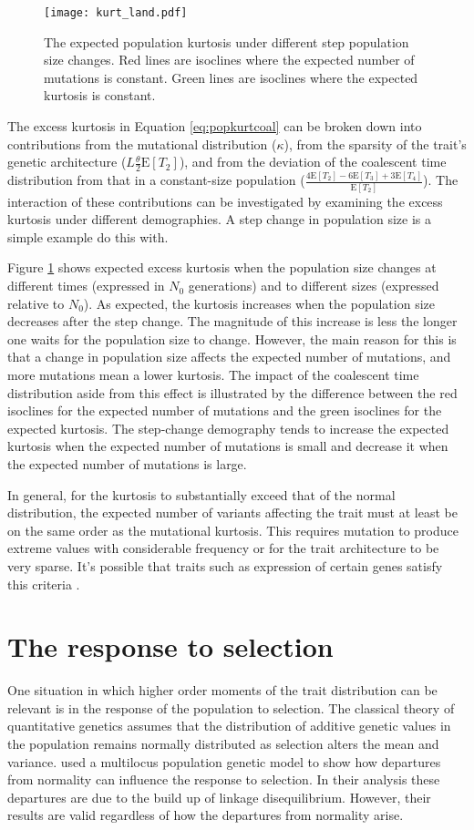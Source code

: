 \documentclass{article}
\newcommand{\T}{\frac{\theta}{2}}
\newcommand{\E}{\mathrm{E}}
\begin{document}
\begin{figure}
  \centering
  \texttt{[image: kurt\_land.pdf]}
  \caption{\footnotesize The expected population kurtosis under different step
    population size changes. Red lines are isoclines where the expected number
    of mutations is constant. Green lines are isoclines where the expected
    kurtosis is constant.}
  \label{fig:kurtscape}
\end{figure}

The excess kurtosis in Equation \ref{eq:popkurtcoal} can be broken down into
contributions from the mutational distribution ($\kappa$), from the sparsity of
the trait's genetic architecture ($L \T \E[T_2]$), and from the deviation of
the coalescent time distribution from that in a constant-size population
($\frac{ 4\E[T_2] - 6\E[T_3] + 3\E[T_4] }{ \E[T_2] }$). The interaction of these
contributions can be investigated by examining the excess kurtosis under
different demographies. A step change in population size is a simple example do
this with.

Figure \ref{fig:kurtscape} shows expected excess kurtosis when the population
size changes at different times (expressed in $N_0$ generations) and to
different sizes (expressed relative to $N_0$). As expected, the kurtosis
increases when the population size decreases after the step change. The
magnitude of this increase is less the longer one waits for the population size
to change. However, the main reason for this is that a change in population size
affects the expected number of mutations, and more mutations mean a lower
kurtosis. The impact of the coalescent time distribution aside from this effect
is illustrated by the difference between the red isoclines for the expected
number of mutations and the green isoclines for the expected kurtosis. The
step-change demography tends to increase the expected kurtosis when the expected
number of mutations is small and decrease it when the expected number of
mutations is large.

In general, for the kurtosis to substantially exceed that of the normal
distribution, the expected number of variants affecting the trait must at least
be on the same order as the mutational kurtosis. This requires mutation to
produce extreme values with considerable frequency or for the trait architecture
to be very sparse. It's possible that traits such as expression of certain genes
satisfy this criteria \citep{Wheeler2016}.
\section{The response to selection}
One situation in which higher order moments of the trait distribution can be
relevant is in the response of the population to selection. The classical theory
of quantitative genetics assumes that the distribution of additive genetic
values in the population remains normally distributed as selection alters the
mean and variance. \citet{Turelli1990} used a multilocus population genetic
model to show how departures from normality can influence the response to
selection. In their analysis these departures are due to the build up of linkage
disequilibrium. However, their results are valid regardless of how the
departures from normality arise.
\end{document}
